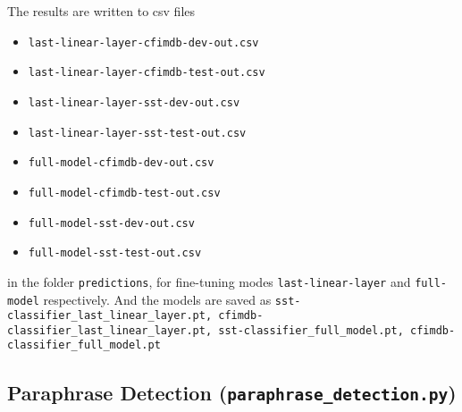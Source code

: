 The results are written to csv files 
\begin{itemize}
\item \texttt{last-linear-layer-cfimdb-dev-out.csv}
\item \texttt{last-linear-layer-cfimdb-test-out.csv}
\item \texttt{last-linear-layer-sst-dev-out.csv}
\item \texttt{last-linear-layer-sst-test-out.csv}
\item \texttt{full-model-cfimdb-dev-out.csv}
\item \texttt{full-model-cfimdb-test-out.csv}
\item \texttt{full-model-sst-dev-out.csv}
\item \texttt{full-model-sst-test-out.csv}
\end{itemize}
in the folder \texttt{predictions}, for fine-tuning modes \texttt{last-linear-layer} and \texttt{full-model} respectively. And the models are saved as \texttt{sst-classifier\_last\_linear\_layer.pt, cfimdb-classifier\_last\_linear\_layer.pt, sst-classifier\_full\_model.pt, cfimdb-classifier\_full\_model.pt}

\subsection{Paraphrase Detection (\texttt{paraphrase\_detection.py})}


